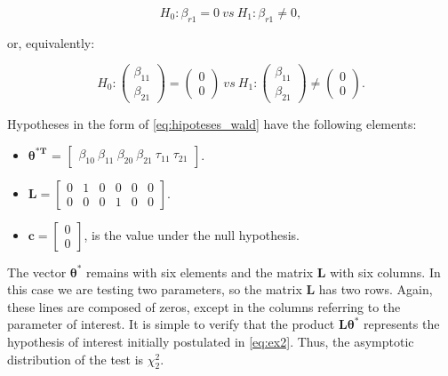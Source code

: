 \documentclass[AMA,STIX1COL]{WileyNJD-v2}
\begin{document}
\begin{equation}
\label{eq:ex2}
H_0: \beta_{r1} = 0 \ vs \ H_1: \beta_{r1} \neq 0,
\end{equation}

\noindent or, equivalently:

$$
H_0: 
\begin{pmatrix}
\beta_{11} \\ 
\beta_{21}
\end{pmatrix} 
= 
\begin{pmatrix}
0 \\ 
0
\end{pmatrix}
\ vs \ 
H_1: 
\begin{pmatrix}
\beta_{11} \\ 
\beta_{21}
\end{pmatrix} 
\neq
\begin{pmatrix}
0 \\ 
0 
\end{pmatrix}.
$$

Hypotheses in the form of \autoref{eq:hipoteses_wald} have the following elements:

\begin{itemize}
  
  \item $\boldsymbol{\theta^{*T}}$ = $\begin{bmatrix} \beta_{10} \  \beta_{11} \ \beta_{20} \ \beta_{21} \ \tau_{11} \ \tau_{21} \end{bmatrix}$.


\item $\boldsymbol{L} = \begin{bmatrix} 0 & 1 & 0 & 0 & 0 & 0 \\
0 & 0 & 0 & 1 & 0 & 0 \end{bmatrix}.$
 
\item $\boldsymbol{c} = \begin{bmatrix} 0 \\ 0 \end{bmatrix}$, is the value under the null hypothesis. 

\end{itemize}

The vector $\boldsymbol{\theta^{*}}$ remains with six elements and the matrix $\boldsymbol{L}$ with six columns. In this case we are testing two parameters, so the matrix $\boldsymbol{L}$ has two rows. Again, these lines are composed of zeros, except in the columns referring to the parameter of interest. It is simple to verify that the product $\boldsymbol{L}\boldsymbol{\theta^{*}}$ represents the hypothesis of interest initially postulated in \autoref{eq:ex2}. Thus, the asymptotic distribution of the test is $\chi^2_2$.
\end{document}
